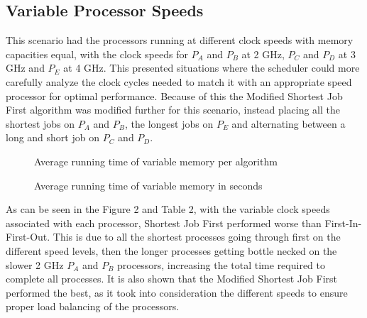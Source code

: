 \documentclass[12pt]{article}
\begin{document}
  \subsection{Variable Processor Speeds}

  This scenario had the processors running at different clock speeds with memory capacities equal, with the clock speeds for $P_A$ and $P_B$ at 2 GHz, $P_C$ and $P_D$ at 3 GHz and $P_E$ at 4 GHz. This presented situations where the scheduler could more carefully analyze the clock cycles needed to match it with an appropriate speed processor for optimal performance. Because of this the Modified Shortest Job First algorithm was modified further for this scenario, instead placing all the shortest jobs on $P_A$ and $P_B$, the longest jobs on $P_E$ and alternating between a long and short job on $P_C$ and $P_D$.

  \begin{figure}[h!]\CenterFloatBoxes
  \begin{floatrow}
    {\caption{Average running time of variable memory per algorithm}}
    \killfloatstyle{}
    {\caption{Average running time of variable memory in seconds}}
  \end{floatrow}
  \end{figure}

  As can be seen in the Figure 2 and Table 2, with the variable clock speeds associated with each processor, Shortest Job First performed worse than First-In-First-Out. This is due to all the shortest processes going through first on the different speed levels, then the longer processes getting bottle necked on the slower 2 GHz $P_A$ and $P_B$ processors, increasing the total time required to complete all processes. It is also shown that the Modified Shortest Job First performed the best, as it took into consideration the different speeds to ensure proper load balancing of the processors.
\end{document}
